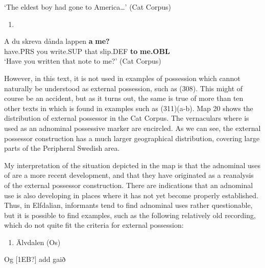 ‘The eldest boy had gone to America…’ (Cat Corpus)
\z


\begin{enumerate} %
\item 
\end{enumerate} %
\ea\label{}
\gll A  du  skreva  dånda  lappen  \textbf{a} \textbf{me?}\\


have.PRS  you  write.SUP  that  slip.DEF  \textbf{to} \textbf{me.OBL}\\ %


‘Have you written that note to me?’ (Cat Corpus)
\z


However, in this text, it is not used in examples of possession which cannot naturally be understood as external possession, such as (308). This might of course be an accident, but as it turns out, the same is true of more than ten other texts in which  is found in examples such as (311)(a-b). Map 20 shows the distribution of external possessor  in the Cat Corpus. The vernaculars where  is used as an adnominal possessive marker are encircled. As we can see, the external possessor construction has a much larger geographical distribution, covering large parts of the Peripheral Swedish area. 

My interpretation of the situation depicted in the map is that the adnominal uses of are a more recent development, and that they have originated as a reanalysis of the external possessor construction. There are indications that an adnominal use is also developing in places where it has not yet become properly established. Thus, in Elfdalian, informants tend to find adnominal uses rather questionable, but it is possible to find examples, such as the following relatively old recording, which do not quite fit the criteria for external possession: 

\begin{enumerate} %
\item 
Älvdalen (Os)

\end{enumerate} %
\ea\label{}
\gll Og  [1EB?]  add  gaið\\


